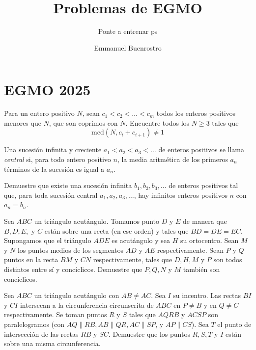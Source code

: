 \documentclass[11pt]{scrartcl}
\title {Problemas de EGMO}
\subtitle {Ponte a entrenar ps}
\author{Emmanuel Buenrostro}
\begin{document}
\maketitle
\tableofcontents

\section{EGMO 2025}
\begin{problema} [EGMO 2025/1]
    Para un entero positivo $N$, sean $c_1 < c_2 <\ldots < c_m$ todos los enteros positivos menores que $N$, que son coprimos con $N$. Encuentre todos los $N \geq 3$ tales que 
    \[\text{mcd} (N, c_i+c_{i+1}) \neq 1\] 
\end{problema}

\begin{problema} [EGMO 2025/2]
    Una sucesión infinita y creciente $a_1 < a_2 < a_3 < \ldots$ de enteros positivos se llama \textit{central} si, para todo entero positivo $n$, la media aritmética de los primeros $a_n$ términos de la sucesión es igual a $a_n$. 
    
    Demuestre que existe una sucesión infinita $b_1, b_2, b_3, \ldots$ de enteros positivos tal que, para toda sucesión central $a_1, a_2, a_3, \ldots$, hay infinitos enteros positivos $n$ con $a_n=b_n$.
\end{problema}

\begin{problema} [EGMO 2025/3]
    Sea $ABC$ un triángulo acutángulo. Tomamos punto $D$ y $E$ de manera que $B,D,E,$ y $C$ están sobre una recta (en ese orden) y tales que $BD=DE=EC$. Supongamos que el triángulo $ADE$ es acutángulo y sea $H$ su ortocentro. Sean $M$ y $N$ los puntos medios de los segmentos $AD$ y $AE$ respectivamente. Sean $P$ y $Q$ puntos en la recta $BM$ y $CN$ respectivamente, tales que $D,H,M$ y $P$ son todos distintos entre sí y concíclicos. Demuestre que $P,Q,N$ y $M$ también son concíclicos. 
\end{problema}

\newpage

\begin{problema} [EGMO 2025/4]
    Sea $ABC$ un triángulo acutángulo con $AB\neq AC$. Sea $I$ su incentro. Las rectas $BI$ y $CI$ intersecan a la circunferencia circunscrita de $ABC$ en $P\neq B$ y en $Q\neq C$ respectivamente. Se toman puntos $R$ y $S$ tales que $AQRB$ y $ACSP$ son paralelogramos (con $AQ \| RB, AB \| QR, AC \| SP$, y $AP \| CS$). Sea $T$ el punto de intersección de las rectas $RB$ y $SC$. Demuestre que los puntos $R,S,T$ y $I$ están sobre una misma circunferencia.
\end{problema}
\end{document}
